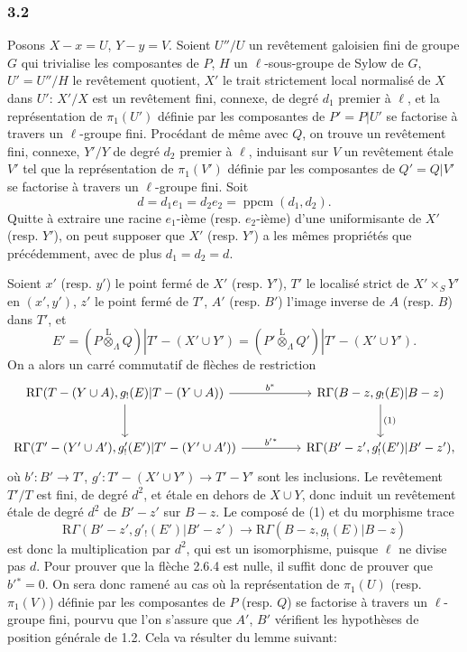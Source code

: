 \documentclass[11pt]{article}
\providecommand{\lten}{\overset{\mathrm L}{\otimes}}
\providecommand{\lten}{\overset{\mathrm L}{\otimes}}
\providecommand{\lten}{\overset{\mathrm L}{\otimes}}
\providecommand{\lten}{\overset{\mathrm L}{\otimes}}
\providecommand{\lten}{\overset{\mathrm L}{\otimes}}
\providecommand{\lten}{\overset{\mathrm L}{\otimes}}
\providecommand{\lten}{\overset{\mathrm L}{\otimes}}
\begin{document}
\subsubsection*{3.2}
Posons $X-x=U$, $Y-y=V$. Soient $U''/U$ un revêtement galoisien fini de groupe $G$ qui trivialise les composantes de $P$, $H$ un $\ell$-sous-groupe de Sylow de $G$, $U'=U''/H$ le revêtement quotient, $X'$ le trait strictement local normalisé de $X$ dans $U'$: $X'/X$ est un revêtement fini, connexe, de degré $d_1$ premier à $\ell$, et la représentation de $\pi_1(U')$ définie par les composantes de $P'=P|U'$ se factorise à travers un $\ell$-groupe fini. Procédant de même avec $Q$, on trouve un revêtement fini, connexe, $Y'/Y$ de degré $d_2$ premier à $\ell$, induisant sur $V$ un revêtement étale $V'$ tel que la représentation de $\pi_1(V')$ définie par les composantes de $Q'=Q|V'$ se factorise à travers un $\ell$-groupe fini. Soit
\[
d=d_1e_1=d_2e_2=\operatorname{ppcm}(d_1,d_2).
\]
Quitte à extraire une racine $e_1$-ième (resp. $e_2$-ième) d'une uniformisante de $X'$ (resp. $Y'$), on peut supposer que $X'$ (resp. $Y'$) a les mêmes propriétés que précédemment, avec de plus $d_1=d_2=d$.

Soient $x'$ (resp. $y'$) le point fermé de $X'$ (resp. $Y'$), $T'$ le localisé strict de $X'\times_S Y'$ en $(x',y')$, $z'$ le point fermé de $T'$, $A'$ (resp. $B'$) l'image inverse de $A$ (resp. $B$) dans $T'$, et
\[
E'=(P\lten_{\Lambda}Q)|T'-(X'\cup Y')
   =(P'\lten_{\Lambda}Q')|T'-(X'\cup Y').
\]
On a alors un carré commutatif de flèches de restriction
\[
\begin{tikzcd}[column sep=huge,row sep=large]
\mathrm R\Gamma(T-(Y\cup A),g_!(E)|T-(Y\cup A))
 \arrow[r,"b^*"] \arrow[d]
&
\mathrm R\Gamma(B-z,g_!(E)|B-z) \arrow[d,"(1)"]\\
\mathrm R\Gamma(T'-(Y'\cup A'),g'_!(E')|T'-(Y'\cup A'))
 \arrow[r,"b'{}^*"]
&
\mathrm R\Gamma(B'-z',g'_!(E')|B'-z') ,
\end{tikzcd}
\]
où $b':B'\to T'$, $g':T'-(X'\cup Y')\to T'-Y'$ sont les inclusions. Le revêtement $T'/T$ est fini, de degré $d^2$, et étale en dehors de $X\cup Y$, donc induit un revêtement étale de degré $d^2$ de $B'-z'$ sur $B-z$. Le composé de (1) et du morphisme trace
\[
\mathrm R\Gamma(B'-z',g'_!(E')|B'-z')
 \longrightarrow
\mathrm R\Gamma(B-z,g_!(E)|B-z)
\]
est donc la multiplication par $d^2$, qui est un isomorphisme, puisque $\ell$ ne divise pas $d$. Pour prouver que la flèche 2.6.4 est nulle, il suffit donc de prouver que $b'{}^*=0$. On sera donc ramené au cas où la représentation de $\pi_1(U)$ (resp. $\pi_1(V)$) définie par les composantes de $P$ (resp. $Q$) se factorise à travers un $\ell$-groupe fini, pourvu que l'on s'assure que $A'$, $B'$ vérifient les hypothèses de position générale de 1.2. Cela va résulter du lemme suivant:
\end{document}
